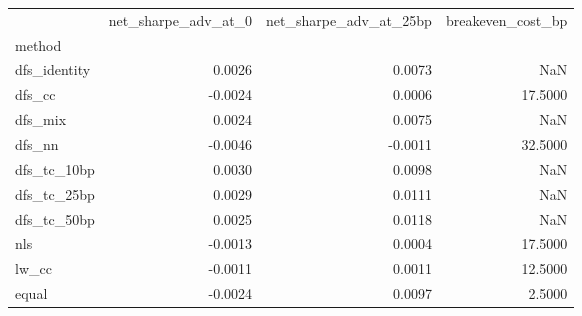 \begin{tabular}{lrrr}
\toprule
 & net_sharpe_adv_at_0 & net_sharpe_adv_at_25bp & breakeven_cost_bp \\
method &  &  &  \\
\midrule
dfs_identity & 0.0026 & 0.0073 & NaN \\
dfs_cc & -0.0024 & 0.0006 & 17.5000 \\
dfs_mix & 0.0024 & 0.0075 & NaN \\
dfs_nn & -0.0046 & -0.0011 & 32.5000 \\
dfs_tc_10bp & 0.0030 & 0.0098 & NaN \\
dfs_tc_25bp & 0.0029 & 0.0111 & NaN \\
dfs_tc_50bp & 0.0025 & 0.0118 & NaN \\
nls & -0.0013 & 0.0004 & 17.5000 \\
lw_cc & -0.0011 & 0.0011 & 12.5000 \\
equal & -0.0024 & 0.0097 & 2.5000 \\
\bottomrule
\end{tabular}

